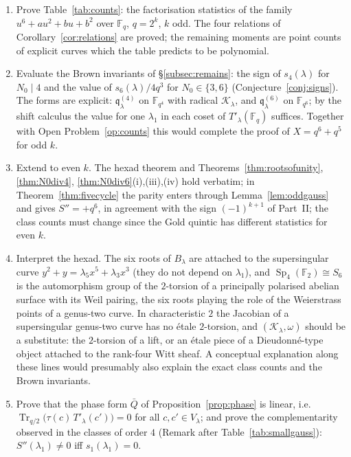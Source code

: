 \documentclass[12pt,a4paper]{amsart}
\theoremstyle{definition}
\newcommand{\F}{\mathbb{F}}
\newcommand{\Tr}{\operatorname{Tr}}
\newcommand{\Sp}{\operatorname{Sp}}
\newcommand{\Kk}{\mathcal{K}}
\newcommand{\qq}{\mathfrak{q}}
\newcommand{\Spp}{S''}
\begin{document}
\begin{enumerate}[label=\textbf{Open Problem \arabic*.},wide,labelindent=0pt,itemsep=0.8ex]
\item\label{op:counts} Prove Table~\ref{tab:counts}: the factorisation statistics of the family $u^6+au^2+bu+b^2$ over $\F_q$, $q=2^k$, $k$ odd. The four relations of Corollary~\ref{cor:relations} are proved; the remaining moments are point counts of explicit curves which the table predicts to be polynomial.
\item\label{op:brown} Evaluate the Brown invariants of \S\ref{subsec:remains}: the sign of $s_4(\lambda)$ for $N_0\mid4$ and the value of $s_6(\lambda)/4q^3$ for $N_0\in\{3,6\}$ (Conjecture~\ref{conj:signs}). The forms are explicit: $\qq^{(4)}_\lambda$ on $\F_{q^4}$ with radical $\Kk_\lambda$, and $\qq^{(6)}_\lambda$ on $\F_{q^6}$; by the shift calculus the value for one $\lambda_1$ in each coset of $T'_\lambda(\F_q)$ suffices. Together with Open Problem~\ref{op:counts} this would complete the proof of $X=q^6+q^5$ for odd $k$.
\item Extend to even $k$. The hexad theorem and Theorems~\ref{thm:rootsofunity}, \ref{thm:N0div4}, \ref{thm:N0div6}(i),(iii),(iv) hold verbatim; in Theorem~\ref{thm:fivecycle} the parity enters through Lemma~\ref{lem:oddgauss} and gives $\Spp=+q^6$, in agreement with the sign $(-1)^{k+1}$ of Part~II; the class counts must change since the Gold quintic has different statistics for even $k$.
\item Interpret the hexad. The six roots of $B_\lambda$ are attached to the supersingular curve $y^2+y=\lambda_5x^5+\lambda_3x^3$ (they do not depend on $\lambda_1$), and $\Sp_4(\F_2)\cong S_6$ is the automorphism group of the $2$-torsion of a principally polarised abelian surface with its Weil pairing, the six roots playing the role of the Weierstrass points of a genus-two curve. In characteristic $2$ the Jacobian of a supersingular genus-two curve has no \'etale $2$-torsion, and $(\Kk_\lambda,\omega)$ should be a substitute: the $2$-torsion of a lift, or an \'etale piece of a Dieudonn\'e-type object attached to the rank-four Witt sheaf. A conceptual explanation along these lines would presumably also explain the exact class counts and the Brown invariants.
\item Prove that the phase form $\bar Q$ of Proposition~\ref{prop:phase} is linear, i.e.\ $\Tr_{q/2}\bigl(\tau(c)\,T'_\lambda(c')\bigr)=0$ for all $c,c'\in V_\lambda$; and prove the complementarity observed in the classes of order $4$ (Remark after Table~\ref{tab:smallgauss}): $\Spp(\lambda_1)\ne0$ iff $s_1(\lambda_1)=0$.

\end{enumerate}
\end{document}

